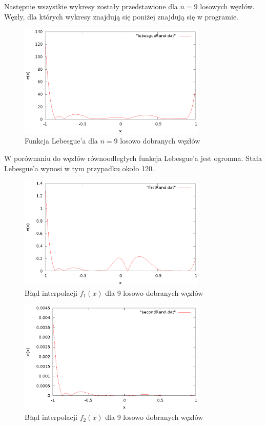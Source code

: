 \documentclass{article}
\begin{document}
Następnie wszystkie wykresy zostały przedstawione dla $n = 9$ losowych węzłów. Węzły, dla których wykresy znajdują się poniżej znajdują się w programie.
\begin{figure}[H]
    \centering
    \includegraphics[width=0.8\textwidth]{wykresy/lebesgueRand.eps}
    \caption{Funkcja Lebesgue'a dla $n = 9$ losowo dobranych węzłów}
\end{figure}
W porównaniu do węzłów równoodległych funkcja Lebesgue'a jest ogromna. Stała Lebesgue'a wynosi w tym przypadku około 120.
\begin{figure}[H]
    \centering
    \includegraphics[width=0.8\textwidth]{wykresy/firstRand.eps}
    \caption{Błąd interpolacji $f_1(x)$ dla 9 losowo dobranych węzłów}
\end{figure}

\begin{figure}[H]
    \centering
    \includegraphics[width=0.8\textwidth]{wykresy/secondRand.eps}
    \caption{Błąd interpolacji $f_2(x)$ dla 9 losowo dobranych węzłów}
\end{figure}
\end{document}
